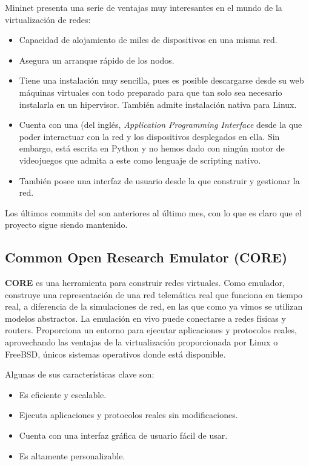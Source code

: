 Mininet presenta una serie de ventajas muy interesantes en el mundo de la virtualización de redes:
\begin{itemize}
\item Capacidad de alojamiento de miles de dispositivos en una misma red. 
\item Asegura un arranque rápido de los nodos.
\item Tiene una instalación muy sencilla, pues es posible descargarse desde su web máquinas virtuales con todo preparado para que tan solo sea necesario instalarla en un hipervisor. También admite instalación nativa para Linux.
\item Cuenta con una  (del inglés, \textit{Application Programming Interface} desde la que poder interactuar con la red y los dispositivos desplegados en ella. Sin embargo, está escrita en Python y no hemos dado con ningún motor de videojuegos que admita a este como lenguaje de scripting nativo.
\item También posee una interfaz de usuario desde la que construir y gestionar la red.
\end{itemize}

Los últimos commits del  son anteriores al último mes, con lo que es claro que el proyecto sigue siendo mantenido.

\subsection{Common Open Research Emulator (CORE)}
\textbf{CORE} es una herramienta para construir redes virtuales. Como emulador, construye una representación de una red telemática real que funciona en tiempo real, a diferencia de la simulaciones de red, en las que como ya vimos se utilizan modelos abstractos.  La emulación en vivo puede conectarse a redes físicas y routers. Proporciona un entorno para ejecutar aplicaciones y protocolos reales, aprovechando las ventajas de la virtualización proporcionada por Linux o FreeBSD, únicos sistemas operativos donde está disponible. 

Algunas de sus características clave son:
\begin{itemize}
\item Es eficiente y escalable.
\item Ejecuta aplicaciones y protocolos reales sin modificaciones.
\item Cuenta con una interfaz gráfica de usuario fácil de usar.
\item Es altamente personalizable.
\end{itemize}

